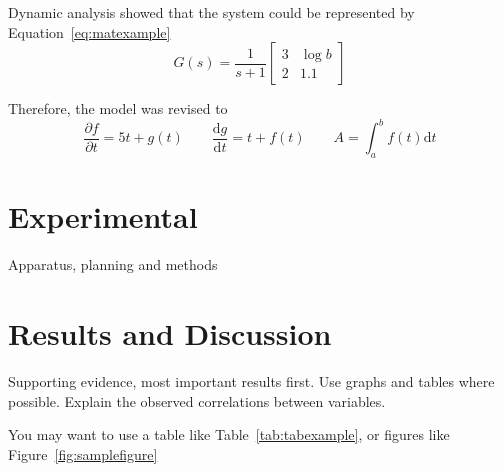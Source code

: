 \documentclass[a4paper,12pt]{article}
\begin{document}
Dynamic analysis showed that the system could be represented by
Equation~\ref{eq:matexample}
\begin{equation}
  \label{eq:matexample}
  G(s) = \frac{1}{s+1}\left [ 
    \begin{array}{cc} 
      3 & \log{b} \\ 
      2 & \num{1.1} 
    \end{array} \right ]
\end{equation}

Therefore, the model was revised to
\begin{equation}
  \frac{\partial f}{\partial t} = 5t + g(t) \qquad \frac{\mathrm{d} g}{\mathrm{d} t} = t + f(t) \qquad A = \int_a^b f(t) \mathrm{d} t
\end{equation}


\section{Experimental}
Apparatus, planning and methods


\section{Results and Discussion}
Supporting evidence, most important results first. Use graphs and tables where possible. Explain the observed correlations between variables.

You may want to use a table like Table~\ref{tab:tabexample}, or figures like Figure~\ref{fig:samplefigure}
\end{document}
